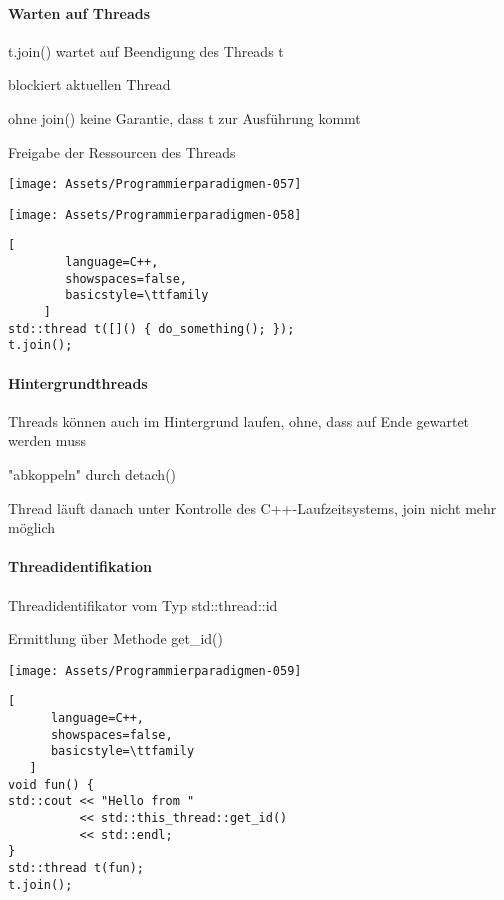 \documentclass[10pt]{article}
\begin{document}
\paragraph{Warten auf Threads}
\begin{itemize*}
  \item t.join() wartet auf Beendigung des Threads t
  \item blockiert aktuellen Thread
  \item ohne join() keine Garantie, dass t zur Ausführung kommt
  \item Freigabe der Ressourcen des Threads
\end{itemize*}
\begin{center}
  \texttt{[image: Assets/Programmierparadigmen-057]}
\end{center}
\begin{center}
  \texttt{[image: Assets/Programmierparadigmen-058]}
\end{center}
\begin{lstlisting}[
        language=C++,
        showspaces=false,
        basicstyle=\ttfamily
     ]
std::thread t([]() { do_something(); });
t.join();
\end{lstlisting}

\paragraph{Hintergrundthreads}
\begin{itemize*}
  \item Threads können auch im Hintergrund laufen, ohne, dass auf Ende gewartet werden muss
  \item "abkoppeln" durch detach()
  \item Thread läuft danach unter Kontrolle des C++-Laufzeitsystems, join nicht mehr möglich
\end{itemize*}

\paragraph{Threadidentifikation}
\begin{itemize*}
  \item Threadidentifikator vom Typ std::thread::id
  \item Ermittlung über Methode get\_id()
\end{itemize*}
\begin{center}
  \texttt{[image: Assets/Programmierparadigmen-059]}
\end{center}
\begin{lstlisting}[
      language=C++,
      showspaces=false,
      basicstyle=\ttfamily
   ]
void fun() {
std::cout << "Hello from "
          << std::this_thread::get_id()
          << std::endl;
}
std::thread t(fun);
t.join();
\end{lstlisting}
\end{document}
